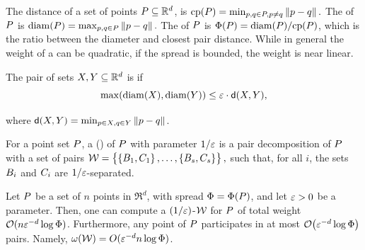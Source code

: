 \documentclass[12pt]{article}%
\begin{document}
The  distance of a set of points
$P \subseteq \mathbb{R}^d$, is
\begin{math}
\cpX{\PS} = \min_{\pa, \pb \in \PS, \pa \neq \pb} \dY{\pa}{\pb}.
\end{math}
The  of $P$ is
\begin{math}
\diamX{\PS} = \max_{\pa, \pb \in \PS} \dY{\pa}{\pb}.
\end{math}
The  of $P$ is
$\spreadX{\PS} = \diamX{\PS} / \cpX{\PS}$, which is the ratio between
the diameter and closest pair distance.  While in general the weight
of a \WSPD can be quadratic, if the spread is bounded, the weight is
near linear.

\begin{defn}
    The pair of sets $X, Y \subseteq \mathbb{R}^d$ is
     if
    \begin{equation*}
        \max \pth{ \diameterX{\PSX}, \diameterX{\PSY} } \leq
        \eps \cdot \dsY{\PSX}{\PSY},
    \end{equation*}
    
    where
    $\dsY{\PSX}{\PSY} = \min_{\pa \in \PSX, \pb \in \PSY}
    \dY{\pa}{\pb}$.
\end{defn}

\begin{defn}
    For a point set $P$, a  (\emphOnly{\WSPD{}}) of $P$ with parameter
    $1/\varepsilon$ is a pair decomposition of $P$ with a set of pairs
    \begin{math}
        \mathcal{W} = \left\{ {\bigl.
           \left\{ {B_1,C_1} \right\},\ldots,\left\{ {B_s,C_s} \right\}} \right\},
    \end{math}
    such that, for all $i$, the sets $B_i$ and $C_i$ are
    $1/\varepsilon$-separated.
\end{defn}


\begin{lemma}
    Let $P$ be a set of $n$ points in $\Re^d$, with spread
    $\spread = \spreadX{\PS}$, and let $\varepsilon > 0$ be a
    parameter. Then, one can compute a $(1/\varepsilon)$-\WSPD $\mathcal{W}$ for
    $P$ of total weight $\mathcal{O}(n \varepsilon^{-d} \log \Phi)$. Furthermore,
    any point of $P$ participates in at most
    $\Of\pth{ \eps^{-d} \log \spread}$ pairs. Namely,
    $\WeightX{\WS} = O( \eps^{-d} n \log \spread )$.
\end{lemma}
\end{document}
